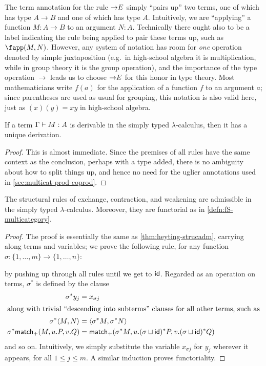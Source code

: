 The term annotation for the rule $\toE$ simply ``pairs up'' two terms, one of which has type $A\to B$ and one of which has type $A$.
Intuitively, we are ``applying'' a function $M:A\to B$ to an argument $N:A$.
Technically there ought also to be a label indicating the rule being applied to pair these terms up, such as $\fapp(M,N)$.
However, any system of notation has room for \emph{one} operation denoted by simple juxtaposition (e.g.\ in high-school algebra it is multiplication, while in group theory it is the group operation), and the importance of the type operation $\to$ leads us to choose $\toE$ for this honor in type theory.
Most mathematicians write $f(a)$ for the application of a function $f$ to an argument $a$; since parentheses are used as usual for grouping, this notation is also valid here, just as $(x)(y)=xy$ in high-school algebra.

\begin{lem}\label{thm:stlc-uniqderiv}
  If a term $\Gamma\types M:A$ is derivable in the simply typed $\lambda$-calculus, then it has a unique derivation.
\end{lem}
\begin{proof}
  This is almost immediate.
  Since the premises of all rules have the same context as the conclusion, perhaps with a type added, there is no ambiguity about how to split things up, and hence no need for the uglier annotations used in \cref{sec:multicat-prod-coprod}.
\end{proof}

\begin{lem}\label{thm:stlc-strucadm}
  The structural rules of exchange, contraction, and weakening are admissible in the simply typed $\lambda$-calculus.
  Moreover, they are functorial as in \cref{defn:fS-multicategory}.
\end{lem}
\begin{proof}
  The proof is essentially the same as \cref{thm:heyting-strucadm}, carrying along terms and variables; we prove the following rule, for any function $\sigma : \{1,\dots,m\} \to \{1,\dots,n\}$:
  \begin{mathpar}
  \end{mathpar}
  by pushing up through all rules until we get to $\idfunc$.
  Regarded as an operation on terms, $\sigma^*$ is defined by the clause
  \begin{align*}
    \sigma^*y_j &= x_{\sigma j}\\
    \intertext{along with trivial ``descending into subterms'' clauses for all other terms, such as}
    \sigma^*\pair M N &= \pair{\sigma^*M}{\sigma^*N}\\
    \sigma^*\case(M,u.P,v.Q) &= \case(\sigma^*M, u.(\sigma\sqcup\idfunc)^*P,v.(\sigma\sqcup\idfunc)^*Q)
  \end{align*}
  and so on.
  Intuitively, we simply substitute the variable $x_{\sigma j}$ for $y_j$ wherever it appears, for all $1\le j\le m$.
  A similar induction proves functoriality.
\end{proof}

